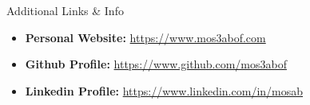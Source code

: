 \documentclass[]{mosabcv}
\begin{document}
    \begin{cvsection}{Additional Links \& Info}
        \begin{cvsubsection}{}{}{}
            \begin{itemize}
                \item \textbf{Personal Website:} \href{https://www.mos3abof.com}{https://www.mos3abof.com}
                \item \textbf{Github Profile:} \href{https://www.github.com/mos3abof}{https://www.github.com/mos3abof}
                \item \textbf{Linkedin Profile:} \href{https://www.linkedin.com/in/mosab}{https://www.linkedin.com/in/mosab}
            \end{itemize}
        \end{cvsubsection}
    \end{cvsection}
\end{document}
